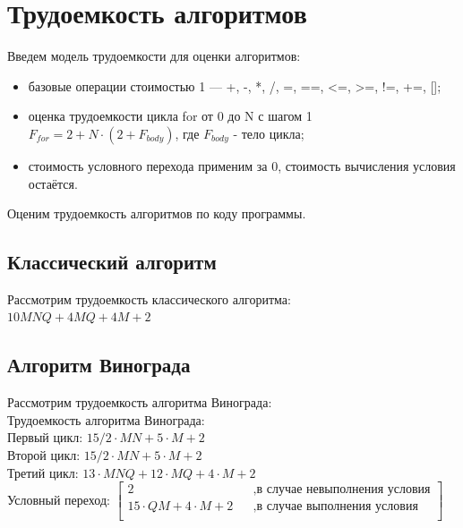 \documentclass[12pt]{report}
\begin{document}
\newpage
\section{Трудоемкость алгоритмов}
Введем модель трудоемкости для оценки алгоритмов: 
\begin{itemize}
	\item базовые операции стоимостью 1 — +, -, *, /, =, ==, <=, >=, !=, +=, [];
	\item оценка трудоемкости цикла for от 0 до N с шагом 1 $F_{for} = 2 + N \cdot (2 + F_{body})$, где $F_{body}$ - тело цикла;
	\item стоимость условного перехода применим за 0, стоимость вычисления условия остаётся.
\end{itemize}

Оценим трудоемкость алгоритмов по коду программы.

\subsection{Классический алгоритм}
Рассмотрим трудоемкость классического алгоритма:\\

$10MNQ + 4MQ + 4 M + 2$ \\


\subsection{Алгоритм Винограда}

Рассмотрим трудоемкость алгоритма Винограда:\\

Трудоемкость алгоритма Винограда:\\

Первый цикл: $15/2 \cdot M  N + 5 \cdot M + 2$ \\

Второй цикл: $15/2 \cdot M  N + 5 \cdot M + 2$\\

Третий цикл: $13 \cdot M  N Q + 12 \cdot M Q + 4 \cdot M + 2$\\

Условный переход: $\begin{bmatrix}
             2    &&, \text{в случае невыполнения условия}\\
             15 \cdot QM + 4 \cdot M + 2 &&, \text{в случае выполнения условия}\\
           \end{bmatrix} $ \\
\end{document}
